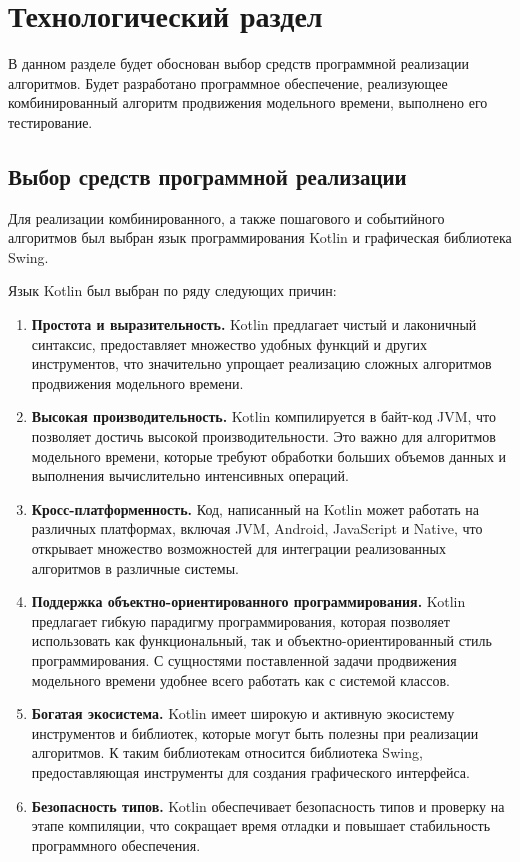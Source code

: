 \chapter{Технологический раздел}
В данном разделе будет обоснован выбор средств программной реализации алгоритмов. Будет разработано программное обеспечение, реализующее комбинированный алгоритм продвижения модельного времени, выполнено его тестирование.

\section{Выбор средств программной реализации}
Для реализации комбинированного, а также пошагового и событийного алгоритмов был выбран язык программирования Kotlin и графическая библиотека Swing.

Язык Kotlin был выбран по ряду следующих причин:

\begin{enumerate}
	\item \textbf{Простота и выразительность.} Kotlin предлагает чистый и лаконичный синтаксис, предоставляет множество удобных функций и других инструментов, что значительно упрощает реализацию сложных алгоритмов продвижения модельного времени.
	
	\item \textbf{Высокая производительность.} Kotlin компилируется в байт-код JVM, что позволяет достичь высокой производительности. Это важно для алгоритмов модельного времени, которые требуют обработки больших объемов данных и выполнения вычислительно интенсивных операций.
	
	\item \textbf{Кросс-платформенность.} Код, написанный на Kotlin может работать на различных платформах, включая JVM, Android, JavaScript и Native, что открывает множество возможностей для интеграции реализованных алгоритмов в различные системы.
	
	\item \textbf{Поддержка объектно-ориентированного программирования.} Kotlin предлагает гибкую парадигму программирования, которая позволяет использовать как функциональный, так и объектно-ориентированный стиль программирования. С сущностями поставленной задачи продвижения модельного времени удобнее всего работать как с системой классов.
	
	\item \textbf{Богатая экосистема.} Kotlin имеет широкую и активную экосистему инструментов и библиотек, которые могут быть полезны при реализации алгоритмов. К таким библиотекам относится библиотека Swing, предоставляющая инструменты для создания графического интерфейса.
	
	\item \textbf{Безопасность типов.} Kotlin обеспечивает безопасность типов и проверку на этапе компиляции, что сокращает время отладки и повышает стабильность программного обеспечения.
\end{enumerate}


